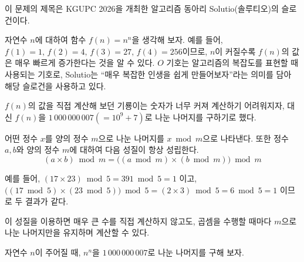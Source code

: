 이 문제의 제목은 KGUPC 2026을 개최한 알고리즘 동아리 Solutio(솔루티오)의 슬로건이다.

자연수 $n$에 대하여 함수 $f(n)=n^n$을 생각해 보자. 
예를 들어, $f(1)=1,\, f(2)=4,\, f(3)=27,\, f(4)=256$이므로, $n$이 커질수록 $f(n)$의 값은 매우 빠르게 증가한다는 것을 알 수 있다. 
$O$ 기호는 알고리즘의 복잡도를 표현할 때 사용되는 기호로, Solutio는 ``매우 복잡한 인생을 쉽게 만들어보자''라는 의미를 담아 해당 슬로건을 사용하고 있다.

$f(n)$의 값을 직접 계산해 보던 기룡이는 숫자가 너무 커져 계산하기 어려워지자, 대신 $f(n)$을 $1\,000\,000\,007(=10^9+7)$로 나눈 나머지를 구하기로 했다.

어떤 정수 $x$를 양의 정수 $m$으로 나눈 나머지를 $x\bmod m$으로 나타낸다. 또한 정수 $a, b$와 양의 정수 $m$에 대하여 다음 성질이 항상 성립한다.
$$(a\times b) \bmod m = \big((a\bmod m)\times(b\bmod m)\big)\bmod m$$

예를 들어, $(17\times 23)\bmod 5 = 391\bmod 5 = 1$ 이고, $\big((17\bmod 5)\times(23\bmod 5)\big) \bmod 5 = (2\times 3)\bmod 5 = 6 \bmod 5 = 1$ 이므로 두 결과가 같다.

이 성질을 이용하면 매우 큰 수를 직접 계산하지 않고도, 곱셈을 수행할 때마다 $m$으로 나눈 나머지만을 유지하며 계산할 수 있다.

자연수 $n$이 주어질 때, $n^n$을 $1\,000\,000\,007$로 나눈 나머지를 구해 보자.